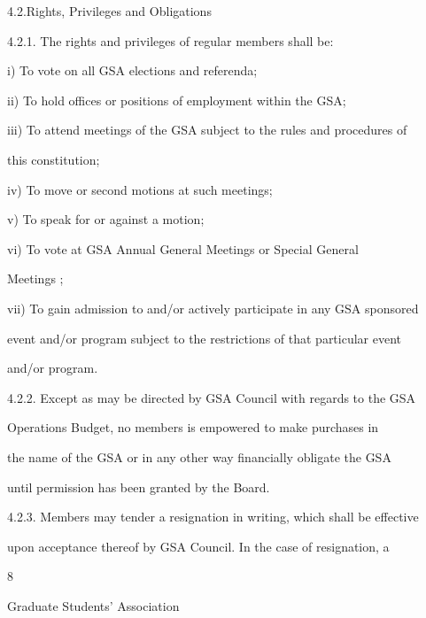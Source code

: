 \documentclass{article}
\begin{document}
  



4.2.Rights, Privileges and Obligations  



4.2.1. The rights and privileges of regular members shall be:  



i)      To vote on all GSA elections and referenda;  



ii)     To hold offices or positions of employment within the GSA;  



iii)    To attend meetings of the GSA subject to the rules and procedures of  

this constitution;  



iv)     To move or second motions at such meetings;  



v)      To speak for or against a motion;  



vi)     To   vote   at   GSA   Annual   General   Meetings   or   Special   General  

Meetings ;  



vii)    To gain admission to and/or actively participate in any GSA sponsored  

event and/or program subject to the restrictions of that particular event  

and/or program.  



4.2.2. Except as may be directed by GSA Council  with regards to the GSA  

Operations Budget, no  members is empowered to make purchases in  

the name of the GSA or in any other way financially obligate the GSA  

until permission has been granted by the Board.  



4.2.3. Members may tender a resignation in writing, which  shall be effective  

upon acceptance thereof by GSA Council. In the case of resignation, a  

 

      8  



       Graduate Students’ Association  
\end{document}
